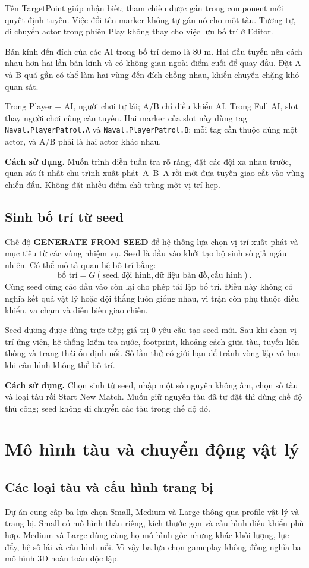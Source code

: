 \documentclass[11pt,a4paper,oneside]{report}
\newcommand{\howto}[1]{\par\smallskip\noindent\textbf{Cách sử dụng.} #1\par}
\begin{document}
Tên TargetPoint giúp nhận biết; tham chiếu được gán trong component mới quyết định tuyến. Việc đổi tên marker không tự gán nó cho một tàu. Tương tự, di chuyển actor trong phiên Play không thay cho việc lưu bố trí ở Editor.

Bán kính đến đích của các AI trong bố trí demo là 80 m. Hai đầu tuyến nên cách nhau hơn hai lần bán kính và có không gian ngoài điểm cuối để quay đầu. Đặt A và B quá gần có thể làm hai vùng đến đích chồng nhau, khiến chuyển chặng khó quan sát.

Trong Player + AI, người chơi tự lái; A/B chỉ điều khiển AI. Trong Full AI, slot thay người chơi cũng cần tuyến. Hai marker của slot này dùng tag \texttt{Naval.PlayerPatrol.A} và \texttt{Naval.PlayerPatrol.B}; mỗi tag cần thuộc đúng một actor, và A/B phải là hai actor khác nhau.
\howto{Muốn trình diễn tuần tra rõ ràng, đặt các đội xa nhau trước, quan sát ít nhất chu trình xuất phát--A--B--A rồi mới đưa tuyến giao cắt vào vùng chiến đấu. Không đặt nhiều điểm chờ trùng một vị trí hẹp.}

\clearpage
\section{Sinh bố trí từ seed}
Chế độ \textbf{GENERATE FROM SEED} để hệ thống lựa chọn vị trí xuất phát và mục tiêu từ các vùng nhiệm vụ. Seed là đầu vào khởi tạo bộ sinh số giả ngẫu nhiên. Có thể mô tả quan hệ bố trí bằng:
\[
 \text{bố trí}=G(\text{seed},\text{đội hình},\text{dữ liệu bản đồ},\text{cấu hình}).
\]
Cùng seed cùng các đầu vào còn lại cho phép tái lập bố trí. Điều này không có nghĩa kết quả vật lý hoặc đội thắng luôn giống nhau, vì trận còn phụ thuộc điều khiển, va chạm và diễn biến giao chiến.

Seed dương được dùng trực tiếp; giá trị 0 yêu cầu tạo seed mới. Sau khi chọn vị trí ứng viên, hệ thống kiểm tra nước, footprint, khoảng cách giữa tàu, tuyến liên thông và trạng thái ổn định nổi. Số lần thử có giới hạn để tránh vòng lặp vô hạn khi cấu hình không thể bố trí.
\howto{Chọn sinh từ seed, nhập một số nguyên không âm, chọn số tàu và loại tàu rồi Start New Match. Muốn giữ nguyên tàu đã tự đặt thì dùng chế độ thủ công; seed không di chuyển các tàu trong chế độ đó.}

\chapter{Mô hình tàu và chuyển động vật lý}
\section{Các loại tàu và cấu hình trang bị}
Dự án cung cấp ba lựa chọn Small, Medium và Large thông qua profile vật lý và trang bị. Small có mô hình thân riêng, kích thước gọn và cấu hình điều khiển phù hợp. Medium và Large dùng cùng họ mô hình gốc nhưng khác khối lượng, lực đẩy, hệ số lái và cấu hình nổi. Vì vậy ba lựa chọn gameplay không đồng nghĩa ba mô hình 3D hoàn toàn độc lập.
\end{document}
